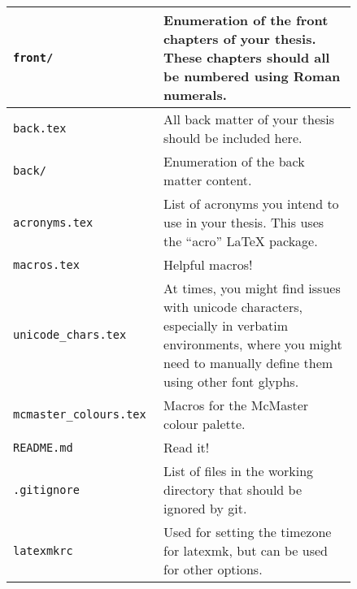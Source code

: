 \begin{longtable}[c]{|>{\raggedright}p{0.3\linewidth}|>{\raggedright\arraybackslash}p{0.54\linewidth}|}
    \texttt{front/} & Enumeration of the front chapters of your thesis. These
    chapters should all be numbered using Roman numerals. \\ \hline

    \texttt{back.tex} & All back matter of your thesis should be included here.
    \\ \hline

    \texttt{back/} & Enumeration of the back matter content.
    \\ \hline

    \texttt{acronyms.tex} & List of acronyms you intend to use in your thesis.
    This uses the ``acro'' \LaTeX{} package.
    \\ \hline

    \texttt{macros.tex} & Helpful macros!
    \\ \hline

    \texttt{unicode\_chars.tex} & At times, you might find issues with unicode
    characters, especially in verbatim environments, where you might need to
    manually define them using other font glyphs.
    \\ \hline

    \texttt{mcmaster\_colours.tex} & Macros for the McMaster colour palette.
    \\ \hline

    \texttt{README.md} & Read it!
    \\ \hline

    \texttt{.gitignore} & List of files in the working directory that should be
    ignored by git.
    \\ \hline

    \texttt{latexmkrc} & Used for setting the timezone for latexmk, but can be
    used for other options.
    \\ \hline
\end{longtable}
